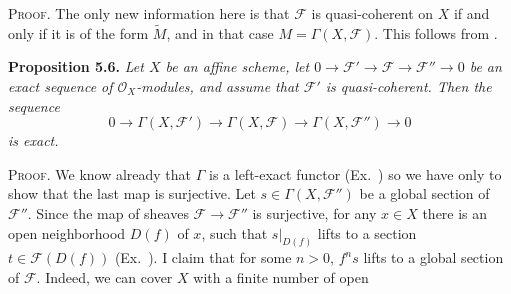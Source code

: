 {\smallskip
\noindent\textsc{Proof.} The only new information here is that $\mathcal F$ is quasi-coherent on $X$ if and only if it is of the form $\widetilde M$, and in that case $M=\Gamma(X,\mathcal F)$. This follows from .

\medskip
\noindent\hypertarget{result-II-5.6}{}\textbf{Proposition 5.6.} \emph{Let $X$ be an affine scheme, let $0\to\mathcal F'\to\mathcal F\to\mathcal F''\to0$ be an exact sequence of $\mathcal O_X$-modules, and assume that $\mathcal F'$ is quasi-coherent. Then the sequence}
\[
0\to\Gamma(X,\mathcal F')\to\Gamma(X,\mathcal F)\to\Gamma(X,\mathcal F'')\to0
\]
\emph{is exact.}

\smallskip
\noindent\textsc{Proof.} We know already that $\Gamma$ is a left-exact functor (Ex.~) so we have only to show that the last map is surjective. Let $s\in\Gamma(X,\mathcal F'')$ be a global section of $\mathcal F''$. Since the map of sheaves $\mathcal F\to\mathcal F''$ is surjective, for any $x\in X$ there is an open neighborhood $D(f)$ of $x$, such that $s|_{D(f)}$ lifts to a section $t\in\mathcal F(D(f))$ (Ex.~). I claim that for some $n>0$, $f^ns$ lifts to a global section of $\mathcal F$. Indeed, we can cover $X$ with a finite number of open
}
